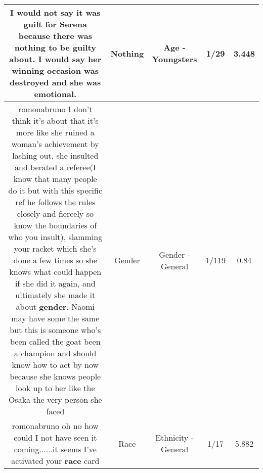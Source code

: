 \documentclass[11pt]{article}
\newlength\mylength
\begin{document}
\begin{center}
\begin{longtable}{|C{.65\mylength}|C{.30\mylength}|C{.12\mylength}|C{.12\mylength}|C{.12\mylength}|}
  \small I would not say it was guilt for Serena because there was \textbf{nothing} to be guilty about. I would say her winning occasion was destroyed and she was emotional.\normalsize   & Nothing & Age - Youngsters & 1/29 & 3.448 \\  \hline
  \small romonabruno I don't think it's about that it's more like she ruined a woman's achievement by lashing out, she insulted and berated a referee(I know that many people do it but with this specific ref he follows the rules closely and fiercely so know the boundaries of who you insult), slamming your racket which she's done a few times so she knows what could happen if she did it again, and ultimately she made it about \textbf{gender}. Naomi may have some the same but this is someone who's been called the goat been a champion and should know how to act by now because she knows people look up to her like the Osaka the very person she faced\normalsize   & Gender & Gender - General & 1/119 & 0.84 \\  \hline
  \small romonabruno oh no how could I not have seen it coming......it seems I've activated your \textbf{race} card\normalsize   & Race & Ethnicity - General & 1/17 & 5.882 \\  \hline

\end{longtable}
\end{center}
\end{document}
